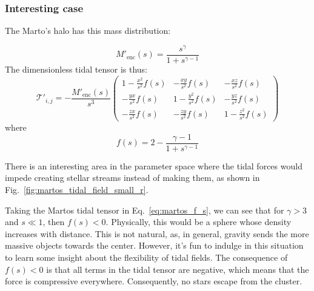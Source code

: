    
        \subsubsection*{Interesting case}

            The Marto's halo has this mass distribution:
            
            \begin{equation}
                M'_\text{enc}(s) = \frac{s^\gamma}{1+s^{\gamma-1}}
            \end{equation}
            The dimensionless tidal tensor is thus: 
            \begin{equation}
                \mathcal{T'}_{i,j}= -\frac{M'_\text{enc}(s)}{s^3}\left(\begin{matrix}
                    1-\frac{x^2}{s^2}f(s) & -\frac{xy}{s^2}f(s) & -\frac{xz}{s^2}f(s) \\
                    -\frac{yx}{s^2}f(s) & 1-\frac{y^2}{s^2}f(s) & -\frac{yz}{s^2}f(s) \\
                    -\frac{zx}{s^2}f(s) & -\frac{zy}{s^2}f(s) & 1-\frac{z^2}{s^2}f(s)
                \end{matrix}\right)
            \end{equation}  
            where 
            \begin{equation}\label{eq:martos_f_s}
                f(s) = 2-\frac{\gamma-1}{1+s^{\gamma-1}}
            \end{equation}

            There is an interesting area in the parameter space where the tidal forces would impede creating stellar streams instead of making them, as shown in Fig.~\ref{fig:martos_tidal_field_small_r}.

            Taking the Martos tidal tensor in Eq.~\ref{eq:martos_f_s}, we can see that for $\gamma > 3$ and $s \ll  1$, then $f(s)< 0$. Physically, this would be a sphere whose density increases with distance. This is not natural, as, in general, gravity sends the more massive objects towards the center. However, it's fun to indulge in this situation to learn some insight about the flexibility of tidal fields. The consequence of $f(s)< 0$ is that all terms in the tidal tensor are negative, which means that the force is compressive everywhere. Consequently, no stars escape from the cluster. 

